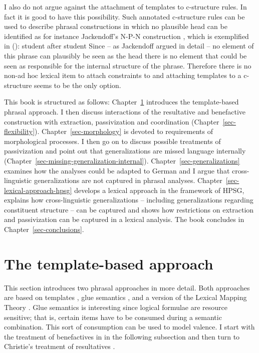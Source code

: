 I also do not argue against the attachment of templates to c-structure rules. In fact it is good to
have this possibility. Such annotated c-structure rules can be used to describe phrasal constructions in which no plausible head
can be identified as for instance Jackendoff's N-P-N construction \citeyearpar{Jackendoff2008a}, which is exemplified in
():
\ea
student after student
\z
Since -- as Jackendoff argued in detail -- no element of this phrase can plausibly be seen as the head
there is no element that could be seen as responsible for the internal structure of the
phrase. Therefore there is no non-ad hoc lexical item to attach constraints to and attaching
templates to a c-structure seems to be the only option.

This book is structured as follows: Chapter~\ref{sec-template-approach} introduces the
template-based phrasal approach. I then discuss interactions of the resultative
and benefactive construction with extraction, passivization and coordination
(Chapter~\ref{sec-flexibility}). Chapter~\ref{sec-morphology} is devoted to requirements of
morphological processes. 
I then go on to discuss possible
treatments of passivization and point out that generalizations are missed language internally
(Chapter~\ref{sec-missing-generalization-internal}).
Chapter~\ref{sec-generalizations} examines how the analyses could be adapted to German and I argue
that cross-linguistic generalizations are not captured in phrasal
analyses. Chapter~\ref{sec-lexical-approach-hpsg} develops a lexical approach in the framework of
HPSG, explains how cross-linguistic generalizations -- including generalizations regarding
constituent structure -- can be captured and shows how restrictions on
extraction and passivization can be captured in a lexical analysis. The book concludes in Chapter~\ref{sec-conclusions}.



\chapter{The template-based approach}
\label{sec-template-approach}

This section introduces two phrasal approaches in more detail. Both approaches are based
on templates \citep{DKK2004a}, glue semantics \citep{Dalrymple99a-ed}, and a version of the Lexical
Mapping Theory \citep{BresnanK89a-u,Kibort2008a}. Glue semantics is interesting since logical
formulae are resource sensitive;
that is, certain items have to
be consumed during a semantic combination. This sort of consumption can be used to model valence. I
start with the treatment of benefactives in \citet{AGT2014a} in the following subsection and then
turn to Christie's treatment of resultatives \citeyearpar{Christie2010a}.

